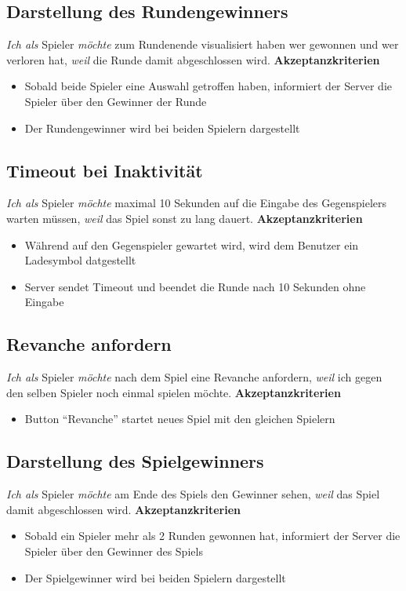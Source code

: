 \documentclass[conference]{IEEEtran}
\begin{document}
\subsection{Darstellung des Rundengewinners}
\textit{Ich als} Spieler
\textit{möchte} zum Rundenende visualisiert haben wer gewonnen und wer verloren hat,
\textit{weil} die Runde damit abgeschlossen wird.
\newline
\textbf{Akzeptanzkriterien}
\begin{itemize}
    \item Sobald beide Spieler eine Auswahl getroffen haben, informiert der Server die Spieler über den Gewinner der Runde
    \item Der Rundengewinner wird bei beiden Spielern dargestellt
\end{itemize}

\subsection{Timeout bei Inaktivität}
\textit{Ich als} Spieler
\textit{möchte} maximal 10 Sekunden auf die Eingabe des Gegenspielers warten müssen,
\textit{weil} das Spiel sonst zu lang dauert.
\newline
\textbf{Akzeptanzkriterien}
\begin{itemize}
    \item Während auf den Gegenspieler gewartet wird, wird dem Benutzer ein Ladesymbol datgestellt
    \item Server sendet Timeout und beendet die Runde nach 10 Sekunden ohne Eingabe
\end{itemize}

\subsection{Revanche anfordern}
\textit{Ich als} Spieler
\textit{möchte} nach dem Spiel eine Revanche anfordern,
\textit{weil} ich gegen den selben Spieler noch einmal spielen möchte.
\newline
\textbf{Akzeptanzkriterien}
\begin{itemize}
    \item Button "`Revanche"' startet neues Spiel mit den gleichen Spielern
\end{itemize}

\subsection{Darstellung des Spielgewinners}
\textit{Ich als} Spieler
\textit{möchte} am Ende des Spiels den Gewinner sehen,
\textit{weil} das Spiel damit abgeschlossen wird.
\newline
\textbf{Akzeptanzkriterien}
\begin{itemize}
    \item Sobald ein Spieler mehr als 2 Runden gewonnen hat, informiert der Server die Spieler über den Gewinner des Spiels
    \item Der Spielgewinner wird bei beiden Spielern dargestellt
\end{itemize}
\end{document}
